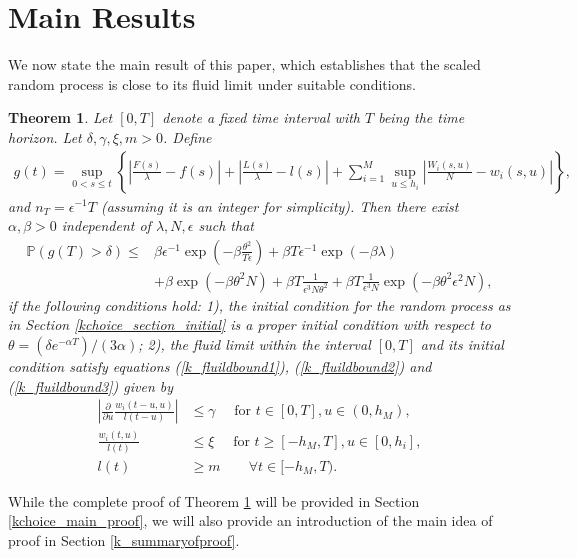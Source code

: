 \documentclass[12pt]{article}
\def\P{\mathbb{P}}
\numberwithin{equation}{section}  %
\newtheorem{thm}{Theorem}[section]
\begin{document}
\section{Main Results}\label{k_mainresult}
We now state the main result of this paper, which establishes that the scaled random process is close to its fluid limit under suitable conditions.
\begin{thm}\label{kchoice_main_theorem}
Let $[0,T]$ denote a fixed time interval with $T$ being the time horizon. Let $\delta,\gamma, \xi,m>0$. Define 
\begin{align} 
g(t)=\sup_{0<s\leq t}\left\{\left|\frac{F(s)}{\lambda}-f(s)\right|+\left|\frac{L(s)}{\lambda}-l(s)\right|+\sum_{i=1}^M \sup_{u\leq h_i} \left|\frac{W_i(s,u)}{N}-w_i(s,u)\right| \right\},\label{kchoice_difference}
\end{align}
and $n_T=\epsilon^{-1}T$ (assuming it is an integer for simplicity). Then there exist $\alpha,\beta>0$ independent of $\lambda,N,\epsilon$ such that
\begin{align} 
\P(g(T)>\delta)\leq& \beta\epsilon^{-1}\exp\left(-\beta \frac{\theta^2}{T\epsilon} \right)+\beta T\epsilon^{-1}\exp\left(-\beta\lambda\right)\nonumber\\
&+\beta \exp\left(-\beta\theta^2N\right)+\beta T\frac{1}{\epsilon^3N\theta^2}+\beta T\frac{1}{\epsilon^3N}\exp\left(-\beta\theta^2\epsilon^2N\right),\label{eq_main_result}
\end{align}   
if the following conditions hold: 1), the initial condition for the random process as in Section \ref{kchoice_section_initial} is a proper initial condition with respect to $\theta=(\delta e^{-\alpha T})/(3\alpha)$; 2), the fluid limit within the interval $[0,T]$ and its initial condition satisfy equations (\ref{k_fluildbound1}), (\ref{k_fluildbound2}) and (\ref{k_fluildbound3}) given by
\begin{align} 
\left|\frac{\partial}{\partial u}\frac{w_i(t-u,u)}{l(t-u)}\right|&\leq \gamma  \quad \text{ for } t\in[0,T],u\in(0,h_M),\label{k_fluildbound1}\\
\frac{w_i(t,u)}{l(t)}&\leq \xi \quad \text{ for }  t\geq [-h_M,T], u\in[0,h_i], \label{k_fluildbound2}\\
l(t)&\geq m \quad\quad \forall t\in[-h_M,T).\label{k_fluildbound3}
\end{align} 
\end{thm}

While the complete proof of Theorem \ref{kchoice_main_theorem} will be provided in Section \ref{kchoice_main_proof}, we will also provide an introduction of the main idea of proof in Section \ref{k_summaryofproof}.
\end{document}
